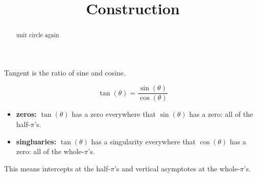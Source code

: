 \documentclass{ximera}
\title{Construction}
\begin{document}
\begin{abstract}
unit circle again
\end{abstract}
\maketitle







Tangent is the ratio of sine and cosine.

\[   \tan(\theta)  =  \frac{\sin(\theta)}{\cos(\theta)}  \]


\begin{itemize}
\item \textbf{zeros:} $\tan(\theta)$ has a zero everywhere that $\sin(\theta)$ has a zero:  all of the half-$\pi$'s.
\item \textbf{singluaries:} $\tan(\theta)$ has a singularity everywhere that $\cos(\theta)$ has a zero:  all of the whole-$\pi$'s.
\end{itemize}

This means intercepts at the half-$\pi$'s and vertical asymptotes at the whole-$\pi$'s.
\end{document}
